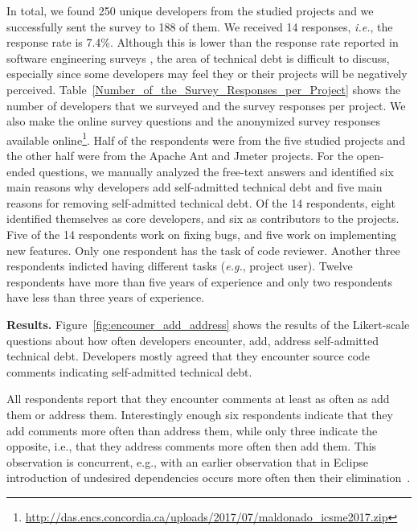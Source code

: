 In total, we found 250 unique developers from the studied projects and we successfully sent the survey to 188 of them.  We received 14 responses, \emph{i.e.}, the response rate is 7.4\%. Although this is lower than the response rate reported in software engineering surveys \cite{Punter2003}, the area of technical debt is difficult to discuss, especially since some developers may feel they or their projects will be negatively perceived. Table~\ref{Number_of_the_Survey_Responses_per_Project} shows the number of developers that we surveyed and the survey responses per project. We also make the online survey questions and the anonymized survey responses available online\footnote{\url{http://das.encs.concordia.ca/uploads/2017/07/maldonado_icsme2017.zip}}. Half of the respondents were from the five studied projects and the other half were from the Apache Ant and Jmeter projects. For the open-ended questions, we manually analyzed the free-text answers and identified six main reasons why developers add self-admitted technical debt and five main reasons for removing self-admitted technical debt. Of the 14 respondents, eight identified themselves as core developers, and six as contributors to the projects. Five of the 14 respondents work on fixing bugs, and five work on implementing new features. Only one respondent has the task of code reviewer. Another three respondents indicted having different tasks (\emph{e.g.}, project user). Twelve respondents have more than five years of experience and only two respondents have less than three years of experience.





\noindent\textbf{Results.} 
Figure~\ref{fig:encouner_add_address} shows the results of the Likert-scale questions about how often developers encounter, add, address self-admitted technical debt. Developers mostly agreed that they encounter source code comments indicating self-admitted technical debt. 




All respondents report that they encounter \SATD comments at least as often as add them or address them. Interestingly enough six respondents indicate that they add \SATD comments more often than address them, while only three indicate the opposite, i.e., that they address \SATD comments more often then add them.
This observation is concurrent, e.g., with an earlier observation that in Eclipse introduction of undesired dependencies occurs more often then their elimination~\cite{BusingeSB15}.


